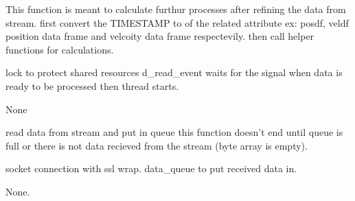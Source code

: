 \documentclass[letterpaper,10pt,english]{sphinxmanual}
\begin{document}
\begin{fulllineitems}
\label{\detokenize{processing:processing.data_processing.processing_from_queue}}
\pysigstartsignatures
{}
\pysigstopsignatures\begin{description}
\sphinxAtStartPar
This function is meant to calculate furthur processes after refining the data from stream.
first convert the TIMESTAMP to  of the related attribute 
ex: posdf, veldf
position data frame and velcoity data frame respectevily.
then call helper functions for calculations.

\sphinxAtStartPar
lock to protect shared resources
d\_read\_event waits for the signal when data is ready to be processed then thread starts.

\sphinxAtStartPar
None

\end{description}

\end{fulllineitems}


\begin{fulllineitems}
\label{\detokenize{processing:processing.data_processing.put_object_to_queue}}
\pysigstartsignatures
{}
\pysigstopsignatures\begin{description}
\sphinxAtStartPar
read data from stream and put in queue this function doesn’t end until queue is full
or there is not data recieved from the stream (byte array is empty).

\sphinxAtStartPar
socket connection with ssl wrap.
data\_queue to put received data in.

\sphinxAtStartPar
None.

\end{description}

\end{fulllineitems}
\end{document}
